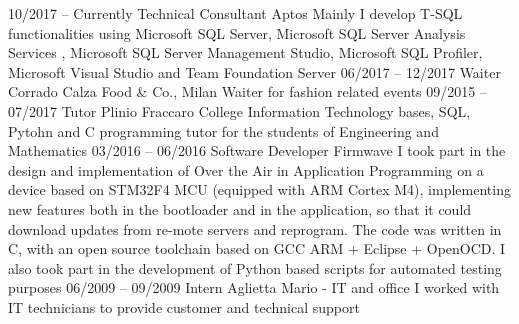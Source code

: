 \documentclass[9pt]{developercv} %
\begin{document}
\begin{entrylist}
	\entry
		{10/2017 -- Currently}
		{Technical Consultant}
		{Aptos}
		{Mainly I develop T-SQL functionalities using Microsoft SQL Server, Microsoft SQL Server Analysis Services , Microsoft SQL Server Management Studio, Microsoft SQL Profiler, Microsoft Visual Studio and Team Foundation Server}
		{}
		{}
	\entry
		{06/2017 -- 12/2017}
		{Waiter}
		{Corrado Calza Food \& Co., Milan}
		{Waiter for fashion related events}
		{}
		{}
	\entry
		{09/2015 -- 07/2017}
		{Tutor}
		{Plinio Fraccaro College}
		{Information Technology bases, SQL, Pytohn and C programming tutor for the students of Engineering and Mathematics}
		{}
		{}
	\entry
		{03/2016 -- 06/2016}
		{Software Developer}
		{Firmwave}
		{I took part in the design and implementation of Over the Air in Application Programming on a device based on STM32F4 MCU (equipped with ARM Cortex M4), implementing new features both in the bootloader and in the application, so that it could download updates from re-mote servers and reprogram. The code was written in C, with an open source toolchain based on GCC ARM + Eclipse + OpenOCD. I also took part in the development of Python based scripts for automated testing purposes}
		{}
		{}
	\entry
		{06/2009 -- 09/2009}
		{Intern}
		{Aglietta Mario - IT and office}
		{I worked with IT technicians to provide customer and technical support}
		{}
		{}
\end{entrylist}


\end{document}
